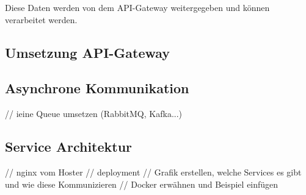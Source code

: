 Diese Daten werden von dem API-Gateway weitergegeben und können verarbeitet werden. 

\subsection{Umsetzung API-Gateway}\label{sec:umsetzung_api_gateway}

\subsection{Asynchrone  Kommunikation}
// ieine Queue umsetzen (RabbitMQ, Kafka...)

\subsection{Service Architektur}
// nginx vom Hoster
// deployment
// Grafik erstellen, welche Services es gibt und wie diese Kommunizieren 
// Docker erwähnen und Beispiel einfügen




